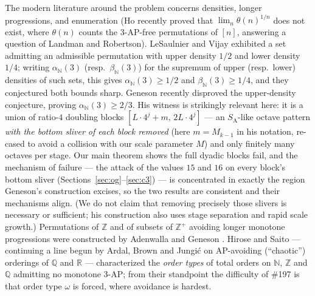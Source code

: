 \documentclass[11pt]{article}
\theoremstyle{definition}
\newcommand{\Z}{\mathbb{Z}}
\newcommand{\N}{\mathbb{N}}
\newcommand{\SA}{S_{\mathrm{A}}}
\begin{document}
The modern literature around the problem concerns densities, longer
progressions, and enumeration (Ho \cite{Ho26} recently proved that
$\lim_n \theta(n)^{1/n}$ does not exist, where $\theta(n)$ counts the
$3$-AP-free permutations of $[n]$, answering a question of Landman and
Robertson). LeSaulnier and Vijay \cite{LV11} exhibited a set admitting an
admissible permutation with upper density $1/2$ and lower density $1/4$;
writing $\alpha_{\N}(3)$ (resp.\ $\beta_{\N}(3)$) for the supremum of upper
(resp.\ lower) densities of such sets, this gives $\alpha_{\N}(3) \ge 1/2$
and $\beta_{\N}(3) \ge 1/4$, and they conjectured both bounds sharp.
Geneson \cite{Gen26} recently disproved the upper-density conjecture, proving
$\alpha_{\N}(3) \ge 2/3$. His witness is strikingly relevant here: it is a
union of ratio-$4$ doubling blocks $[L\cdot 4^j + m,\, 2L\cdot 4^j]$ --- an
$\SA$-like octave pattern \emph{with the bottom sliver of each block
removed} (here $m = M_{k-1}$ in his notation, re-cased to avoid a collision
with our scale parameter $M$) and only finitely many octaves per stage. Our
main theorem shows the full dyadic blocks fail, and the mechanism of failure
--- the attack of the values $15$ and $16$ on every block's bottom sliver
(Sections~\ref{sec:og}--\ref{sec:c3}) --- is concentrated in exactly the
region Geneson's construction excises, so the two results are consistent
and their mechanisms align. (We do not claim that
removing precisely those slivers is necessary or sufficient; his
construction also uses stage separation and rapid scale growth.) Permutations of $\Z$ and of subsets of $\Z^+$
avoiding longer monotone progressions were constructed by Adenwalla
\cite{Ad24} and Geneson \cite{Gen18}. Hirose and Saito \cite{HS24} ---
continuing a line begun by Ardal, Brown and Jungi\'c \cite{ABJ11} on
AP-avoiding (``chaotic'') orderings of $\mathbb{Q}$ and $\mathbb{R}$ ---
characterized the \emph{order types} of total orders on $\N$, $\Z$ and $\mathbb{Q}$
admitting no monotone 3-AP; from their standpoint the difficulty of \#197 is
that order type $\omega$ is forced, where avoidance is hardest.
\end{document}
